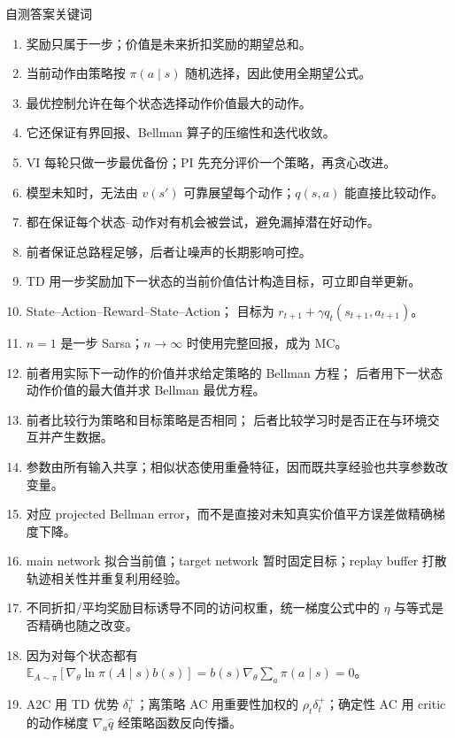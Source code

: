 \documentclass[11pt,a4paper,fontset=fandol]{ctexart}
\newcommand{\E}{\mathbb{E}}
\begin{document}
\begin{goalbox}{自测答案关键词}
\begin{enumerate}
  \item 奖励只属于一步；价值是未来折扣奖励的期望总和。
  \item 当前动作由策略按 \(\pi(a\mid s)\) 随机选择，因此使用全期望公式。
  \item 最优控制允许在每个状态选择动作价值最大的动作。
  \item 它还保证有界回报、Bellman 算子的压缩性和迭代收敛。
  \item VI 每轮只做一步最优备份；PI 先充分评价一个策略，再贪心改进。
  \item 模型未知时，无法由 \(v(s')\) 可靠展望每个动作；\(q(s,a)\)
  能直接比较动作。
  \item 都在保证每个状态--动作对有机会被尝试，避免漏掉潜在好动作。
  \item 前者保证总路程足够，后者让噪声的长期影响可控。
  \item TD 用一步奖励加下一状态的当前价值估计构造目标，可立即自举更新。
  \item State--Action--Reward--State--Action；
  目标为 \(r_{t+1}+\gamma q_t(s_{t+1},a_{t+1})\)。
  \item \(n=1\) 是一步 Sarsa；\(n\to\infty\) 时使用完整回报，成为 MC。
  \item 前者用实际下一动作的价值并求给定策略的 Bellman 方程；
  后者用下一状态动作价值的最大值并求 Bellman 最优方程。
  \item 前者比较行为策略和目标策略是否相同；
  后者比较学习时是否正在与环境交互并产生数据。
  \item 参数由所有输入共享；相似状态使用重叠特征，因而既共享经验也共享参数改变量。
  \item 对应 projected Bellman error，而不是直接对未知真实价值平方误差做精确梯度下降。
  \item main network 拟合当前值；target network 暂时固定目标；replay buffer
  打散轨迹相关性并重复利用经验。
  \item 不同折扣/平均奖励目标诱导不同的访问权重，统一梯度公式中的
  \(\eta\) 与等式是否精确也随之改变。
  \item 因为对每个状态都有
  \(\E_{A\sim\pi}[\nabla_\theta\ln\pi(A\mid s)b(s)]
  =b(s)\nabla_\theta\sum_a\pi(a\mid s)=0\)。
  \item A2C 用 TD 优势 \(\delta_t^+\)；离策略 AC 用重要性加权的
  \(\rho_t\delta_t^+\)；确定性 AC 用 critic 的动作梯度
  \(\nabla_a\hat q\) 经策略函数反向传播。
\end{enumerate}
\end{goalbox}
\end{document}
